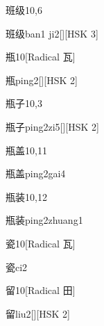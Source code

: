 \begin{entry}{班级}{10,6}
  \begin{phonetics}{班级}{ban1 ji2}[][HSK 3]
  \end{phonetics}
\end{entry}

\begin{entry}{瓶}{10}[Radical 瓦]
  \begin{phonetics}{瓶}{ping2}[][HSK 2]
  \end{phonetics}
\end{entry}

\begin{entry}{瓶子}{10,3}
  \begin{phonetics}{瓶子}{ping2zi5}[][HSK 2]
  \end{phonetics}
\end{entry}

\begin{entry}{瓶盖}{10,11}
  \begin{phonetics}{瓶盖}{ping2gai4}
  \end{phonetics}
\end{entry}

\begin{entry}{瓶装}{10,12}
  \begin{phonetics}{瓶装}{ping2zhuang1}
  \end{phonetics}
\end{entry}

\begin{entry}{瓷}{10}[Radical ⽡]
  \begin{phonetics}{瓷}{ci2}
  \end{phonetics}
\end{entry}

\begin{entry}{留}{10}[Radical 田]
  \begin{phonetics}{留}{liu2}[][HSK 2]
  \end{phonetics}
\end{entry}

